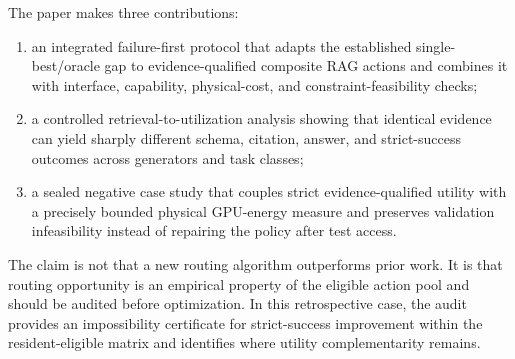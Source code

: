The paper makes three contributions:

\begin{enumerate}
    \item an integrated failure-first protocol that adapts the established
    single-best/oracle gap to evidence-qualified composite RAG actions and combines
    it with interface, capability, physical-cost, and constraint-feasibility checks;
    \item a controlled retrieval-to-utilization analysis showing that identical
    evidence can yield sharply different schema, citation, answer, and strict-success
    outcomes across generators and task classes;
    \item a sealed negative case study that couples strict evidence-qualified
    utility with a precisely bounded physical GPU-energy measure and preserves
    validation infeasibility instead of repairing the policy after test access.
\end{enumerate}

The claim is not that a new routing algorithm outperforms prior work. It is that
routing opportunity is an empirical property of the eligible action pool and
should be audited before optimization. In this retrospective case, the audit
provides an impossibility certificate for strict-success improvement within the
resident-eligible matrix and identifies where utility complementarity remains.
